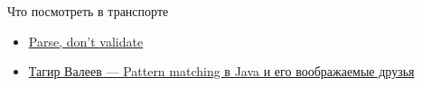 
    \begin{frame}{Что посмотреть в транспорте}
        \begin{itemize}
            \item \href{https://lexi-lambda.github.io/blog/2019/11/05/parse-don-t-validate/}{\color{blue} \underline{Parse, don’t validate}}
            \item \href{https://youtu.be/qurG_J81_Cs?si=tINacE3c6ZF3CkvF}{\color{blue} Тагир Валеев — Pattern matching в Java и его воображаемые друзья}
        \end{itemize}
    \end{frame}


